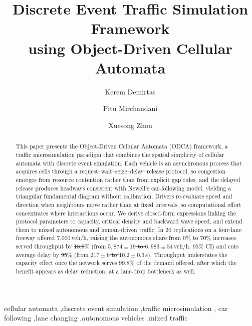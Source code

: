 \documentclass[review,number]{elsarticle} %
\providecommand{\DIFaddtex}[1]{{\protect\color{blue}\uwave{#1}}} %
\providecommand{\DIFdeltex}[1]{{\protect\color{red}\sout{#1}}}                      %
\providecommand{\DIFaddbegin}{} %
\providecommand{\DIFaddend}{} %
\providecommand{\DIFdelbegin}{} %
\providecommand{\DIFdelend}{} %
\providecommand{\DIFadd}[1]{\texorpdfstring{\DIFaddtex{#1}}{#1}} %
\providecommand{\DIFdel}[1]{\texorpdfstring{\DIFdeltex{#1}}{}} %
\newcommand{\DIFscaledelfig}{0.5}
\newlength{\DIFdelgraphicswidth} %
\newlength{\DIFdelgraphicsheight} %
\newcommand{\DIFaddincludegraphics}[2][]{{\color{blue}\fbox{\DIFOincludegraphics[#1]{#2}}}} %
\newcommand{\DIFdelincludegraphics}[2][]{%
\sbox{\DIFdelgraphicsbox}{\DIFOincludegraphics[#1]{#2}}%
\settoboxwidth{\DIFdelgraphicswidth}{\DIFdelgraphicsbox} %
\settoboxtotalheight{\DIFdelgraphicsheight}{\DIFdelgraphicsbox} %
\scalebox{\DIFscaledelfig}{%
\parbox[b]{\DIFdelgraphicswidth}{\usebox{\DIFdelgraphicsbox}\\[-\baselineskip] \rule{\DIFdelgraphicswidth}{0em}}\llap{\resizebox{\DIFdelgraphicswidth}{\DIFdelgraphicsheight}{%
\setlength{\unitlength}{\DIFdelgraphicswidth}%
\begin{picture}(1,1)%
\thicklines\linethickness{2pt} %
{\color[rgb]{1,0,0}\put(0,0){\framebox(1,1){}}}%
{\color[rgb]{1,0,0}\put(0,0){\line( 1,1){1}}}%
{\color[rgb]{1,0,0}\put(0,1){\line(1,-1){1}}}%
\end{picture}%
}\hspace*{3pt}}} %
} %
\DeclareRobustCommand{\DIFaddbegin}{\DIFOaddbegin \let\includegraphics\DIFaddincludegraphics} %
\DeclareRobustCommand{\DIFaddend}{\DIFOaddend \let\includegraphics\DIFOincludegraphics} %
\DeclareRobustCommand{\DIFdelbegin}{\DIFOdelbegin \let\includegraphics\DIFdelincludegraphics} %
\DeclareRobustCommand{\DIFdelend}{\DIFOaddend \let\includegraphics\DIFOincludegraphics} %
\begin{document}
\begin{frontmatter}

\title{Discrete Event Traffic Simulation Framework\\using Object-Driven Cellular Automata}

\author[asu]{Kerem Demirtas}
\author[asu]{Pitu Mirchandani}
\author[ssebe]{Xuesong Zhou}


\begin{abstract}
This paper presents the Object-Driven Cellular Automata (ODCA) framework, a traffic microsimulation paradigm that combines the spatial simplicity of cellular automata with discrete event simulation. Each vehicle is an asynchronous process that acquires cells through a request--wait--seize--delay--release protocol, so congestion emerges from resource contention rather than from explicit gap rules, and the delayed release produces headways consistent with Newell's car-following model, yielding a triangular fundamental diagram without calibration. Drivers re-evaluate speed and direction when neighbours move rather than at fixed intervals, so computational effort concentrates where interactions occur. We derive closed-form expressions linking the protocol parameters to capacity, critical density and backward wave speed, and extend them to mixed autonomous and human-driven traffic. In 20 replications on a four-lane freeway offered 7{,}000\,veh/h, raising the autonomous share from 0\% to 70\% increases served throughput by \DIFdelbegin \DIFdel{18.9}\DIFdelend \DIFaddbegin \DIFadd{18.6}\DIFaddend \% (from \DIFdelbegin \DIFdel{$5{,}874 \pm 19$ to $6{,}983 \pm 34$}\DIFdelend \DIFaddbegin \DIFadd{$5{,}891 \pm 18$ to $6{,}984 \pm 35$}\DIFaddend \,veh/h, 95\% CI) and cuts average delay by \DIFdelbegin \DIFdel{95}\DIFdelend \DIFaddbegin \DIFadd{96}\DIFaddend \% (from \DIFdelbegin \DIFdel{$217 \pm 6$ to $10.2 \pm 0.3$}\DIFdelend \DIFaddbegin \DIFadd{$215 \pm 5$ to $8.7 \pm 0.2$}\DIFaddend \,s). Throughput understates the capacity effect once the network serves 99.8\% of the demand offered, after which the benefit appears as delay reduction, at a lane-drop bottleneck as well.
\end{abstract}

\begin{keyword}
cellular automata \sep discrete event simulation \sep traffic microsimulation \sep
car following \sep lane changing \sep autonomous vehicles \sep mixed traffic
\end{keyword}

\end{frontmatter}
\end{document}
